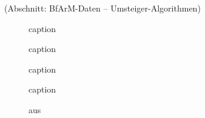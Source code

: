 



(Abschnitt: BfArM-Daten -- Umsteiger-Algorithmen)

\begin{figure}[H]
    \centering\large%
    \resizebox{.99\textwidth}{!}{}
    \normalsize\caption{caption}
\end{figure}

\newpage


\begin{figure}[H]
    \centering\large%
    \resizebox{.99\textwidth}{!}{}
    \normalsize\caption{caption}
\end{figure}

\begin{figure}[H]
    \centering\large%
    \resizebox{.99\textwidth}{!}{}
    \normalsize\caption{caption}
\end{figure}

\newpage

\begin{figure}[H]
    \centering\LARGE%
    \resizebox{.60\textwidth}{!}{}
    \normalsize\caption{caption}
\end{figure}

\newpage

\begin{figure}[H]
    \centering
    \setlength{\fboxsep}{10pt}\color{black!20}
    \normalcolor\caption{aus \citep[Seite 172]{gross2013handbook}}
\end{figure}

